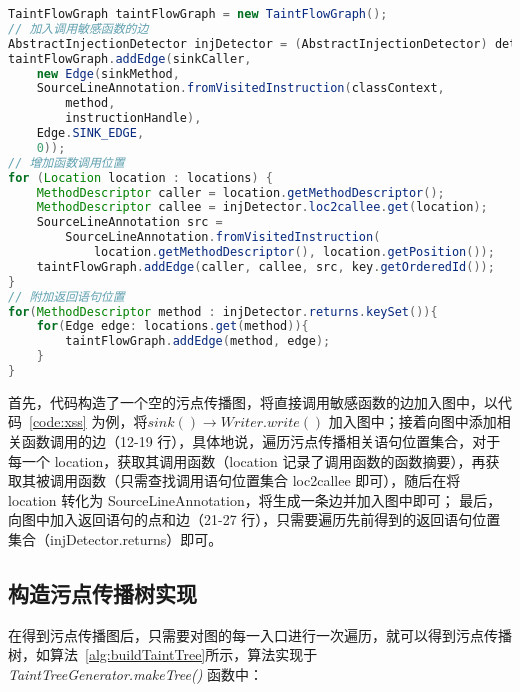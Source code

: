 \begin{minipage}{0.9\textwidth}
\begin{lstlisting}[language=Java, caption={构造污点传播图的实现}, label={code:taintGraph}]
TaintFlowGraph taintFlowGraph = new TaintFlowGraph();
// 加入调用敏感函数的边
AbstractInjectionDetector injDetector = (AbstractInjectionDetector) detector;
taintFlowGraph.addEdge(sinkCaller,
    new Edge(sinkMethod,
    SourceLineAnnotation.fromVisitedInstruction(classContext, 
        method,
        instructionHandle),
    Edge.SINK_EDGE,
    0));
// 增加函数调用位置
for (Location location : locations) {
    MethodDescriptor caller = location.getMethodDescriptor();
    MethodDescriptor callee = injDetector.loc2callee.get(location);
    SourceLineAnnotation src =
        SourceLineAnnotation.fromVisitedInstruction(
            location.getMethodDescriptor(), location.getPosition());
    taintFlowGraph.addEdge(caller, callee, src, key.getOrderedId());
}
// 附加返回语句位置
for(MethodDescriptor method : injDetector.returns.keySet()){
    for(Edge edge: locations.get(method)){
        taintFlowGraph.addEdge(method, edge);
    }
}
\end{lstlisting}
\end{minipage}

首先，代码构造了一个空的污点传播图，将直接调用敏感函数的边加入图中，以代码~\ref{code:xss} 为例，将$sink() \rightarrow Writer.write()$ 加入图中；接着向图中添加相关函数调用的边（12-19 行），具体地说，遍历污点传播相关语句位置集合，对于每一个 location，获取其调用函数（location 记录了调用函数的函数摘要），再获取其被调用函数（只需查找调用语句位置集合 loc2callee 即可），随后在将 location 转化为 SourceLineAnnotation，将生成一条边并加入图中即可； 最后，向图中加入返回语句的点和边（21-27 行），只需要遍历先前得到的返回语句位置集合（injDetector.returns）即可。\\

\subsection{构造污点传播树实现}
在得到污点传播图后，只需要对图的每一入口进行一次遍历，就可以得到污点传播树，如算法~\ref{alg:buildTaintTree}所示，算法实现于 \textit{TaintTreeGenerator.makeTree()} 函数中：

